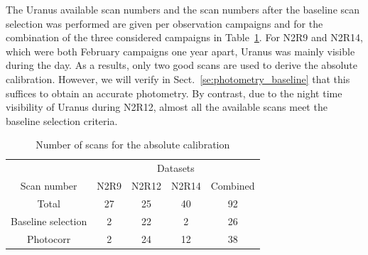 The Uranus available scan numbers and the scan numbers after the baseline scan
selection was performed are given per observation campaigns and for
the combination of the three considered campaigns in
Table~\ref{tab:absolute_calibration_scan_numbers}. For N2R9 and N2R14,
which were both February campaigns one year apart, Uranus was mainly
visible during the day. As a results, only two good scans are used to
derive the absolute calibration. However, we will verify in
Sect.~\ref{se:photometry_baseline} that this suffices to obtain an
accurate photometry. By contrast, due to the night time visibility of
Uranus during N2R12, almost all the available scans meet the baseline
selection criteria. 

\begin{table}[!thbp]
\begin{center}
\begin{tabular}{|c|c|c|c|c|c|}
  \hline
  \multicolumn{2}{|c|}{}            &  \multicolumn{4}{|c|}{Datasets} \\\cline{3-6}
  \multicolumn{2}{|c|}{Scan number} &  N2R9  & N2R12  &  N2R14  &  Combined \\
  \hline\hline
  \multicolumn{2}{|c|}{Total}       &   27   &   25    &   40    &    92  \\
  \hline
  \multicolumn{2}{|c|}{Baseline selection}     &   2    &   22    &    2    &    26  \\
  \multicolumn{2}{|c|}{Photocorr}              &   2    &   24    &   12    &    38  \\
\hline\hline
\end{tabular}
\caption[Absolute calibration scan numbers]{Number of scans for the absolute calibration}
\label{tab:absolute_calibration_scan_numbers}
\end{center}
\end{table}


